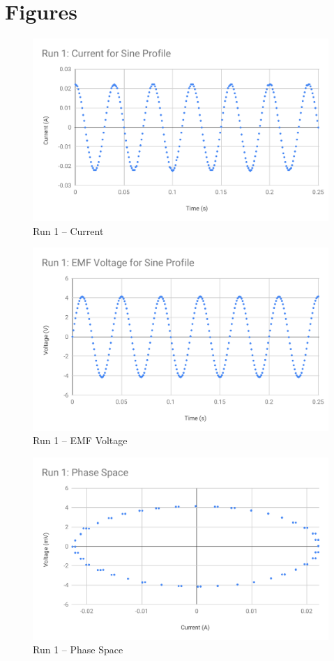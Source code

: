 \section{Figures}
%
\begin{figure}[ht]
	\centering
	\includegraphics[scale=0.74]{image/04-faraday/run-1-I.pdf}
	\caption{Run 1 -- Current}
	\label{figure.04.run.1.I}
\end{figure}
%
\begin{figure}[ht]
	\centering
	\includegraphics[scale=0.74]{image/04-faraday/run-1-V.pdf}
	\caption{Run 1 -- EMF Voltage}
	\label{figure.04.run.1.V}
\end{figure}
%
\begin{figure}[ht]
	\centering
	\includegraphics[scale=0.74]{image/04-faraday/run-1-phase-space.pdf}
	\caption{Run 1 -- Phase Space}
	\label{figure.04.run.1.phase.space}
\end{figure}
